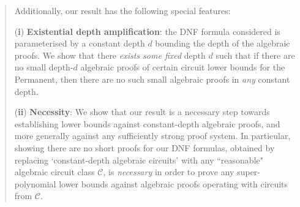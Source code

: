 \documentclass[11pt,letter]{article}
\theoremstyle{remark} %
\newcommand{\IPS}{%
    {
        \ComplexityFont{IPS} 
    }
}
\newcommand{\ACZ}{\ensuremath{\ComplexityFont{AC}^0}}
\begin{document}
\begin{abstract}

%


\smallskip 
Additionally, our result has the following special features: 

(\textbf{i}) 
\textbf{Existential depth amplification}: the DNF formula considered is parameterised by a constant depth $d$ bounding the depth of the algebraic proofs. We show that there \emph{exists some fixed} depth $d$ such that if there are no small depth-$d$ algebraic proofs of certain circuit lower bounds for the Permanent, then there are no such small algebraic proofs in {\it any} constant depth. 

(\textbf{ii}) 
\textbf{Necessity}: 
We show that our result is a necessary step towards establishing lower bounds against constant-depth algebraic proofs, and more generally against any sufficiently strong proof system. 
In particular, showing there are no short proofs for our  DNF formulas, obtained by replacing `constant-depth algebraic circuits' with any ``reasonable" algebraic circuit class $\mathcal C$, is {\it necessary} in order to prove any super-polynomial lower bounds against algebraic proofs operating with circuits from $\mathcal C$. 





\end{abstract}
\end{document}
